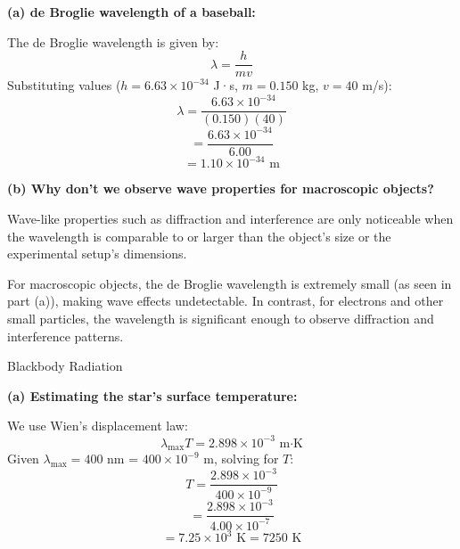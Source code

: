 \documentclass[addpoints]{exam}
\begin{document}
\begin{questions}
\begin{solution}
\textbf{(a) de Broglie wavelength of a baseball:}  

The de Broglie wavelength is given by:  
\[
\lambda = \frac{h}{mv}
\]
Substituting values (\( h = 6.63 \times 10^{-34} \) J·s, \( m = 0.150 \) kg, \( v = 40 \) m/s):  
\[
\lambda = \frac{6.63 \times 10^{-34}}{(0.150)(40)}
\]
\[
= \frac{6.63 \times 10^{-34}}{6.00}
\]
\[
= 1.10 \times 10^{-34} \text{ m}
\]

\textbf{(b) Why don’t we observe wave properties for macroscopic objects?}  

Wave-like properties such as diffraction and interference are only noticeable when the wavelength is comparable to or larger than the object's size or the experimental setup's dimensions.  

For macroscopic objects, the de Broglie wavelength is extremely small (as seen in part (a)), making wave effects undetectable. In contrast, for electrons and other small particles, the wavelength is significant enough to observe diffraction and interference patterns.  

\end{solution}


\question[8] Blackbody Radiation
\begin{solution}
\textbf{(a) Estimating the star’s surface temperature:}  

We use Wien’s displacement law:  
\[
\lambda_{\text{max}} T = 2.898 \times 10^{-3} \text{ m·K}
\]
Given \( \lambda_{\text{max}} = 400 \) nm = \( 400 \times 10^{-9} \) m, solving for \( T \):  
\[
T = \frac{2.898 \times 10^{-3}}{400 \times 10^{-9}}
\]
\[
= \frac{2.898 \times 10^{-3}}{4.00 \times 10^{-7}}
\]
\[
= 7.25 \times 10^3 \text{ K} = 7250 \text{ K}
\]


\end{solution}
\end{questions}
\end{document}
